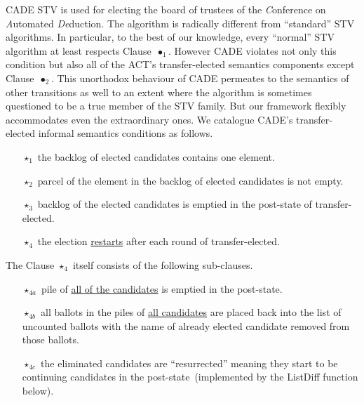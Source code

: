 \documentclass[10pt,conference]{IEEEtran}
\begin{document}
CADE STV is used for electing the board of trustees of the \emph{C}onference on \emph{A}utomated \emph{De}duction. The algorithm is radically different from ``standard'' STV algorithms. In particular, to the best of our knowledge, every ``normal'' STV algorithm at least respects Clause~$\bullet_{1}$. However CADE violates not only this condition but also all of the ACT's transfer-elected semantics components except Clause~$\bullet_{2}$. This unorthodox behaviour of CADE permeates to the semantics of other transitions as well to an extent where the algorithm is sometimes questioned to be a true member  of the STV family. But our framework flexibly  accommodates even the extraordinary ones. We catalogue CADE's transfer-elected informal semantics  conditions as follows.
\begin{itemize}
\item[$\star_{1}$] the backlog of  elected candidates contains one element.
\item[$\star_{2}$] parcel of the element in the backlog of elected candidates is not empty.
\item[$\star_{3}$] backlog of the elected candidates is emptied in the post-state of transfer-elected.
\item[$\star_{4}$] the election \underline{restarts} after each round of transfer-elected.
\end{itemize}  
The Clause $\star_{4}$ itself consists of the following sub-clauses.
\begin{itemize}
\item[$\star_{4a}$] pile of \underline{all of the candidates} is emptied in the post-state.
\item[$\star_{4b}$] all ballots in the piles of \underline{all candidates} are placed back into the list of uncounted ballots with the name of already elected candidate removed from those ballots.
\item[$\star_{4c}$] the eliminated candidates are ``resurrected'' meaning they start to be continuing candidates in the post-state~(implemented by the ListDiff function below).  
\end{itemize}
\end{document}
